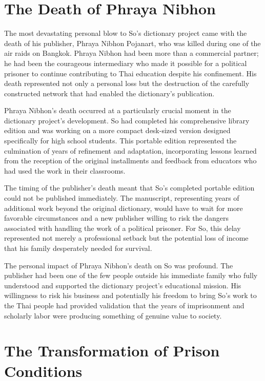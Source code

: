 \documentclass[
  Letterpaper,
]{scrbook}
\begin{document}
\section{The Death of Phraya Nibhon}\label{the-death-of-phraya-nibhon}

The most devastating personal blow to So's dictionary project came with
the death of his publisher, Phraya Nibhon Pojanart, who was killed
during one of the air raids on Bangkok. Phraya Nibhon had been more than
a commercial partner; he had been the courageous intermediary who made
it possible for a political prisoner to continue contributing to Thai
education despite his confinement. His death represented not only a
personal loss but the destruction of the carefully constructed network
that had enabled the dictionary's publication.

Phraya Nibhon's death occurred at a particularly crucial moment in the
dictionary project's development. So had completed his comprehensive
library edition and was working on a more compact desk-sized version
designed specifically for high school students. This portable edition
represented the culmination of years of refinement and adaptation,
incorporating lessons learned from the reception of the original
installments and feedback from educators who had used the work in their
classrooms.

The timing of the publisher's death meant that So's completed portable
edition could not be published immediately. The manuscript, representing
years of additional work beyond the original dictionary, would have to
wait for more favorable circumstances and a new publisher willing to
risk the dangers associated with handling the work of a political
prisoner. For So, this delay represented not merely a professional
setback but the potential loss of income that his family desperately
needed for survival.

The personal impact of Phraya Nibhon's death on So was profound. The
publisher had been one of the few people outside his immediate family
who fully understood and supported the dictionary project's educational
mission. His willingness to risk his business and potentially his
freedom to bring So's work to the Thai people had provided validation
that the years of imprisonment and scholarly labor were producing
something of genuine value to society.

\section{The Transformation of Prison
Conditions}\label{the-transformation-of-prison-conditions}
\end{document}
